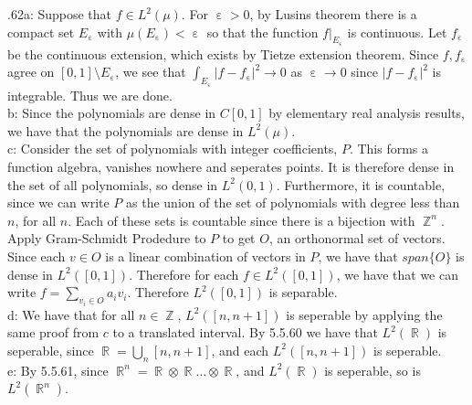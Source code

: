 \documentclass[letterpaper]{article}
\DeclareMathOperator{\R}{\mathbb{R}}
\DeclareMathOperator{\Z}{\mathbb{Z}}
\DeclareMathOperator{\ep}{\varepsilon}
\begin{document}
 .62a:
Suppose that $f\in L^2(\mu)$. For $\ep>0$, by Lusins theorem there is a compact set $E_{\ep}$ with $\mu(E_{\ep}) < \ep$ so that the function $f|_{E_{\ep}}$ is continuous. 
Let $f_{\ep}$ be the continuous extension, which exists by Tietze extension theorem. Since $f,f_{\ep}$ agree on $[0,1] \setminus E_{\ep}$, we see that $\int_{E_{\ep}} |f- f_{\ep}|^2 \to 0  $ as $\ep \to 0$ since $|f-f_{\ep}|^2$ is integrable. 
Thus we are done. 
\newline \\ b: Since the polynomials are dense in $C[0,1]$ by elementary real analysis results, we have that the polynomials are dense in $L^2(\mu)$. 
\newline \\ c: Consider the set of polynomials with integer coefficients, $P$. This forms a function algebra, vanishes nowhere and seperates points. 
It is therefore dense in the set of all polynomials, so dense in $L^2(0,1)$. Furthermore, it is countable, since we can write $P$ as the union of 
the set of polynomials with degree less than $n$, for all $n$. Each of these sets is countable since there is a bijection with $\Z^n$. 
Apply Gram-Schmidt Prodedure to $P$ to get $O$, an orthonormal set of vectors. Since each $v\in O$ is a linear combination of vectors in $P$, we have that $span\{O\}$ is dense in $L^2([0,1])$. 
Therefore for each $f\in L^2([0,1])$, we have that we can write $f = \sum_{v_i\in O}a_i v_i$. Therefore $L^2([0,1])$ is separable. 
\newline \\ d: We have that for all $n\in \Z$, $L^2([n,n+1])$ is seperable by applying the same proof from $c$ to a translated interval. 
By 5.5.60 we have that $L^2(\R) $ is seperable, since $\R = \bigcup_n [n,n+1]$, and each $L^2([n,n+1])$ is seperable. 
\newline \\ e: By 5.5.61, since $\R^n = \R \otimes \R \dots \otimes \R$, and $L^2(\R)$ is seperable, so is $L^2(\R^n)$. 
\end{document}
